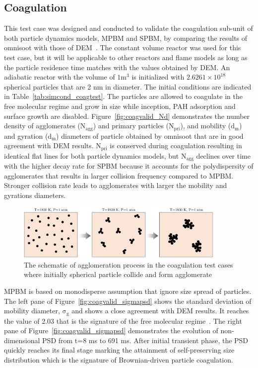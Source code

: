 \subsection{Coagulation}
This test case was designed and conducted to validate the coagulation sub-unit of both particle dynamics models, MPBM and SPBM, by comparing the results of omnisoot with those of DEM~\citep{kholghy2021surface}. The constant volume reactor was used for this test case, but it will be applicable to other reactors and flame models as long as the particle residence time matches with the values obtained by DEM. An adiabatic reactor with the volume of $1 \mathrm{m^3}$ is initialized with $2.6261\times10^{18}$ spherical particles that are 2 nm in diameter. The initial conditions are indicated in Table~\ref{tab:simcond_coagtest}. The particles are allowed to coagulate in the free molecular regime and grow in size while inception, PAH adsorption and surface growth are disabled. Figure~\ref{fig:coagvalid_Nd} demonstrates the number density of agglomerates ($\mathrm{N_{agg}}$) and primary particles ($\mathrm{N_{pri}}$), and mobility ($\mathrm{d_m}$) and gyration ($\mathrm{d_m}$) diameters of particle obtained by omnisoot that are in good agreement with DEM results. $\mathrm{N_{pri}}$ is conserved during coagulation resulting in identical flat lines for both particle dynamics models, but $\mathrm{N_{agg}}$ declines over time with the higher decay rate for SPBM because it accounts for the polydispersity of agglomerates that results in larger collision frequency compared to MPBM. Stronger collision rate leads to agglomerates with larger the mobility and gyrations diameters.

\begin{figure}[!htbp]
	\centering
	\includegraphics[width=0.9\textwidth]{Figures/Results/Validation/Coagulation/coagulation_scheme.pdf}
	\caption{The schematic of agglomeration process in the coagulation test cases where initially spherical particle collide and form agglomerate}
	\label{fig:coagscheme}
\end{figure}

MPBM is based on monodisperse assumption that ignore size spread of particles. The left pane of Figure~\ref{fig:coagvalid_sigmapsd} shows the standard deviation of mobility diameter, $\mathrm{\sigma_g}$ and shows a close agreement with DEM results. It reaches the value of 2.03 that is the signature of the free molecular regime~\citep{vemury1995self}. The right pane of Figure~\ref{fig:coagvalid_sigmapsd} demonstrates the evolution of non-dimensional PSD from t=8 ms to 691 ms. After initial transient phase, the PSD quickly reaches its final stage marking the attainment of self-preserving size distribution which is the signature of Brownian-driven particle coagulation.  

